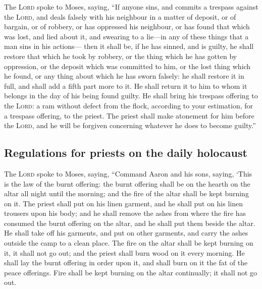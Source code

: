  The \textsc{Lord} spoke to Moses, saying, 
``If anyone sins, and commits a trespass against the \textsc{Lord}, and
deals falsely with his neighbour in a matter of deposit, or of bargain,
or of robbery, or has oppressed his neighbour,  or has
found that which was lost, and lied about it, and swearing to a lie---in
any of these things that a man sins in his actions--- 
then it shall be, if he has sinned, and is guilty, he shall restore that
which he took by robbery, or the thing which he has gotten by
oppression, or the deposit which was committed to him, or the lost thing
which he found,  or any thing about which he has sworn
falsely: he shall restore it in full, and shall add a fifth part more to
it. He shall return it to him to whom it belongs in the day of his being
found guilty.  He shall bring his trespass offering to the
\textsc{Lord}: a ram without defect from the flock, according to your
estimation, for a trespass offering, to the priest.  The
priest shall make atonement for him before the \textsc{Lord}, and he
will be forgiven concerning whatever he does to become guilty.''

\hypertarget{regulations-for-priests-on-the-daily-holocaust}{%
\subsection{Regulations for priests on the daily
holocaust}\label{regulations-for-priests-on-the-daily-holocaust}}

 The \textsc{Lord} spoke to Moses, saying, 
``Command Aaron and his sons, saying, `This is the law of the burnt
offering: the burnt offering shall be on the hearth on the altar all
night until the morning; and the fire of the altar shall be kept burning
on it.  The priest shall put on his linen garment, and he
shall put on his linen trousers upon his body; and he shall remove the
ashes from where the fire has consumed the burnt offering on the altar,
and he shall put them beside the altar.  He shall take
off his garments, and put on other garments, and carry the ashes outside
the camp to a clean place.  The fire on the altar shall
be kept burning on it, it shall not go out; and the priest shall burn
wood on it every morning. He shall lay the burnt offering in order upon
it, and shall burn on it the fat of the peace offerings. 
Fire shall be kept burning on the altar continually; it shall not go
out.

